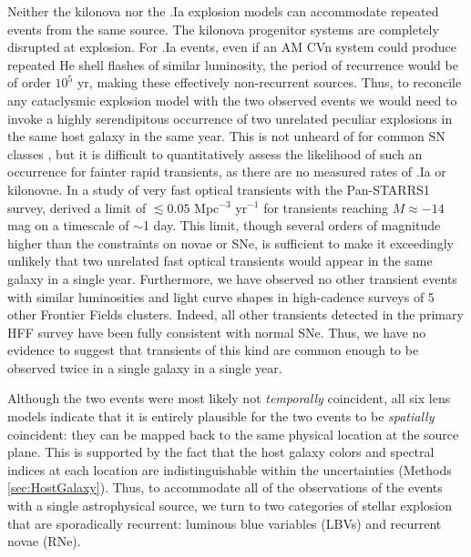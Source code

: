 Neither the kilonova nor the .Ia explosion models can accommodate
repeated events from the same source. The kilonova progenitor systems
are completely disrupted at explosion.  For .Ia events, even if an AM
CVn system could produce repeated He shell flashes of similar
luminosity, the period of recurrence would be of order $10^5$ yr,
making these effectively non-recurrent sources.  Thus, to reconcile
any cataclysmic explosion model with the two observed \spock events we
would need to invoke a highly serendipitous occurrence of two
unrelated peculiar explosions in the same host galaxy in the same
year. This is not unheard of for common SN classes
\citep[e.g.][]{Poznanski:2009}, but it is difficult to quantitatively
assess the likelihood of such an occurrence for fainter rapid
transients, as there are no measured rates of .Ia or kilonovae.  In a
study of very fast optical transients with the Pan-STARRS1 survey,
\citet{Berger:2013b} derived a limit of $\lesssim0.05$ Mpc$^{-3}$
yr$^{-1}$ for transients reaching $M\approx -14$ mag on a timescale of
$\sim$1 day.  This limit, though several orders of magnitude higher
than the constraints on novae or SNe, is sufficient to make it
exceedingly unlikely that two unrelated fast optical transients would
appear in the same galaxy in a single year.  Furthermore, we have
observed no other transient events with similar luminosities and light
curve shapes in high-cadence surveys of 5 other Frontier Fields
clusters. Indeed, all other transients detected in the primary HFF
survey have been fully consistent with normal SNe.  Thus, we have no
evidence to suggest that transients of this kind are common enough to
be observed twice in a single galaxy in a single year.



Although the two events were most likely not {\it temporally}
coincident, all six lens models indicate that it is entirely
plausible for the two \spock events to be {\it spatially} coincident: they
can be mapped back to the same physical location at the source
plane. This is supported by the fact that the host galaxy colors and
spectral indices at each \spock location are indistinguishable within
the uncertainties (Methods \ref{sec:HostGalaxy}).  
Thus, to accommodate all of the observations of the \spock events with
a single astrophysical source, we turn to two categories of
stellar explosion that are sporadically recurrent: luminous blue
variables (LBVs) and recurrent novae (RNe).

